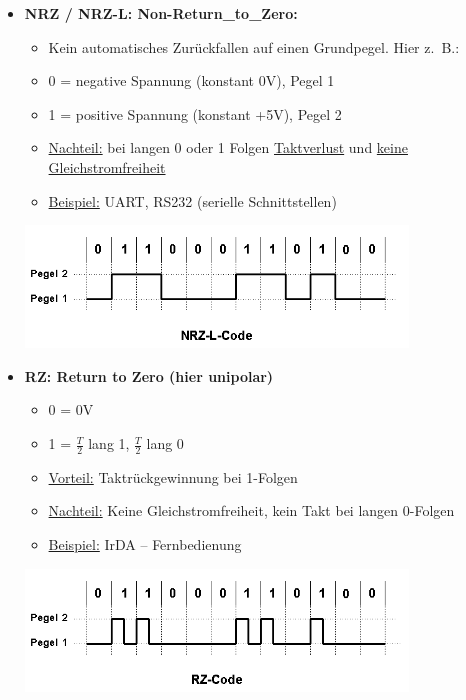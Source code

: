 \begin{itemize}
    \item \textbf{NRZ / NRZ-L: Non-Return\_to\_Zero:}
    \begin{itemize}
        \item Kein automatisches Zurückfallen auf einen Grundpegel.
        Hier z.\ B.:
        \item 0 = negative Spannung (konstant 0V), Pegel 1
        \item 1 = positive Spannung (konstant +5V), Pegel 2
        \item \underline{Nachteil:} bei langen 0 oder 1 Folgen \underline{Taktverlust} und \underline{keine Gleichstromfreiheit}
        \item \underline{Beispiel:} UART, RS232 (serielle Schnittstellen)
    \end{itemize}
    \includegraphics[width=0.8\textwidth]{img/NRZ-L-Code}
    \item \textbf{RZ: Return to Zero (hier unipolar)}
    \begin{itemize}
        \item 0 = 0V
        \item 1 = $\frac{T}{2}$ lang 1, $\frac{T}{2}$ lang 0
        \item \underline{Vorteil:} Taktrückgewinnung bei 1-Folgen
        \item \underline{Nachteil:} Keine Gleichstromfreiheit, kein Takt bei langen 0-Folgen
        \item \underline{Beispiel:} IrDA – Fernbedienung
    \end{itemize}
    \includegraphics[width=0.8\textwidth]{img/RZ-Code}
\end{itemize}


